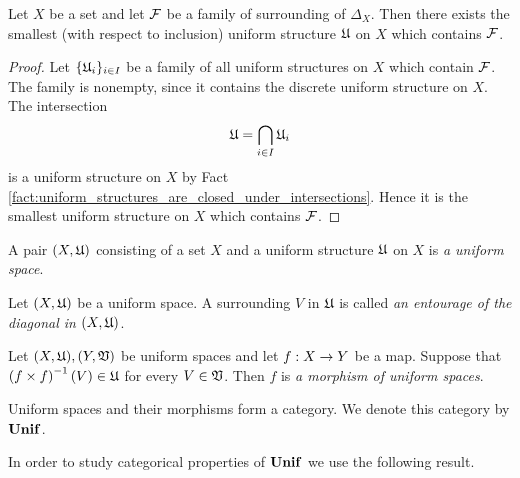 \begin{corollary}\label{corollary:smallest_uniform_structure_containing_given_family_of_surroundings}
Let $X$ be a set and let ${\mathcal F}$ be a family of surrounding of $\Delta_X$. Then there exists the smallest (with respect to inclusion) uniform structure ${\mathfrak U}$ on $X$ which contains ${\mathcal F}$.
\end{corollary}
\begin{proof}
Let $\{{\mathfrak U}_i\}_{i\in I}$ be a family of all uniform structures on $X$ which contain ${\mathcal F}$. The family is nonempty, since it contains the discrete uniform structure on $X$. The intersection $${\mathfrak U} = \bigcap_{i\in I}{\mathfrak U}_i$$
is a uniform structure on $X$ by Fact \ref{fact:uniform_structures_are_closed_under_intersections}. Hence it is the smallest uniform structure on $X$ which contains ${\mathcal F}$.
\end{proof}

\begin{definition}
A pair $(X,{\mathfrak U})$ consisting of a set $X$ and a uniform structure ${\mathfrak U}$ on $X$ is \textit{a uniform space}.
\end{definition}

\begin{definition}
Let $(X,{\mathfrak U})$ be a uniform space. A surrounding $V$ in ${\mathfrak U}$ is called \textit{an entourage of the diagonal in $(X,{\mathfrak U})$}. 
\end{definition}

\begin{definition}
Let $(X,{\mathfrak U}),(Y,{\mathfrak V})$ be uniform spaces and let $f:X\rightarrow Y$ be a map. Suppose that $\left(f\times f\right)^{-1}(V) \in {\mathfrak U}$ for every $V\in {\mathfrak V}$. Then $f$ is \textit{a morphism of uniform spaces}. 
\end{definition}

\begin{remark}\label{remark:category_of_uniform_spaces}
Uniform spaces and their morphisms form a category. We denote this category by $\mathbf{Unif}$.
\end{remark}
\noindent
In order to study categorical properties of $\mathbf{Unif}$ we use the following result.

